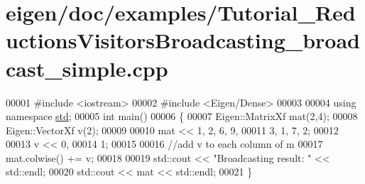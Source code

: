 \hypertarget{eigen_2doc_2examples_2_tutorial___reductions_visitors_broadcasting__broadcast__simple_8cpp_source}{}\section{eigen/doc/examples/\+Tutorial\+\_\+\+Reductions\+Visitors\+Broadcasting\+\_\+broadcast\+\_\+simple.cpp}
\label{eigen_2doc_2examples_2_tutorial___reductions_visitors_broadcasting__broadcast__simple_8cpp_source}

\begin{DoxyCode}
00001 \textcolor{preprocessor}{#include <iostream>}
00002 \textcolor{preprocessor}{#include <Eigen/Dense>}
00003 
00004 \textcolor{keyword}{using namespace }\hyperlink{namespacestd}{std};
00005 \textcolor{keywordtype}{int} main()
00006 \{
00007   Eigen::MatrixXf mat(2,4);
00008   Eigen::VectorXf v(2);
00009   
00010   mat << 1, 2, 6, 9,
00011          3, 1, 7, 2;
00012          
00013   v << 0,
00014        1;
00015        
00016   \textcolor{comment}{//add v to each column of m}
00017   mat.colwise() += v;
00018   
00019   std::cout << \textcolor{stringliteral}{"Broadcasting result: "} << std::endl;
00020   std::cout << mat << std::endl;
00021 \}
\end{DoxyCode}
